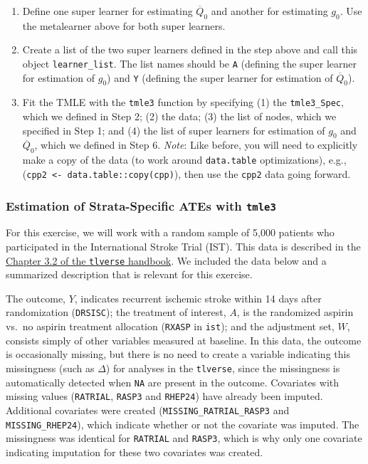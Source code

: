 \documentclass[12pt, krantz2,]{krantz}
\providecommand{\tightlist}{%
  \setlength{\itemsep}{0pt}\setlength{\parskip}{0pt}}
\theoremstyle{definition}
\theoremstyle{definition}
\theoremstyle{definition}
\newcommand{\1}{\mathbbm{1}}
\begin{document}
\begin{enumerate}
\def\labelenumi{\arabic{enumi}.}
\setcounter{enumi}{4}
\tightlist
\item
  Define one super learner for estimating \(\overline{Q}_0\) and another for
  estimating \(g_0\). Use the metalearner above for both super learners.
\item
  Create a list of the two super learners defined in the step above and call
  this object \texttt{learner\_list}. The list names should be \texttt{A} (defining the super
  learner for estimation of \(g_0\)) and \texttt{Y} (defining the super learner for
  estimation of \(\overline{Q}_0\)).
\item
  Fit the TMLE with the \texttt{tmle3} function by specifying (1) the \texttt{tmle3\_Spec},
  which we defined in Step 2; (2) the data; (3) the list of nodes, which we
  specified in Step 1; and (4) the list of super learners for estimation of
  \(g_0\) and \(\overline{Q}_0\), which we defined in Step 6. \emph{Note}: Like before,
  you will need to explicitly make a copy of the data (to work around
  \texttt{data.table} optimizations), e.g., (\texttt{cpp2\ \textless{}-\ data.table::copy(cpp)}), then
  use the \texttt{cpp2} data going forward.
\end{enumerate}

\hypertarget{tmle3-ex2}{%
\subsubsection{\texorpdfstring{Estimation of Strata-Specific ATEs with \texttt{tmle3}}{Estimation of Strata-Specific ATEs with tmle3}}\label{tmle3-ex2}}

For this exercise, we will work with a random sample of 5,000 patients who
participated in the International Stroke Trial (IST). This data is described in
the \protect\hyperlink{ist}{Chapter 3.2 of the \texttt{tlverse} handbook}. We included the data below
and a summarized description that is relevant for this exercise.

The outcome, \(Y\), indicates recurrent ischemic stroke within 14 days after
randomization (\texttt{DRSISC}); the treatment of interest, \(A\), is the randomized
aspirin vs.~no aspirin treatment allocation (\texttt{RXASP} in \texttt{ist}); and the
adjustment set, \(W\), consists simply of other variables measured at baseline. In
this data, the outcome is occasionally missing, but there is no need to create a
variable indicating this missingness (such as \(\Delta\)) for analyses in the
\texttt{tlverse}, since the missingness is automatically detected when \texttt{NA} are present
in the outcome. Covariates with missing values (\texttt{RATRIAL}, \texttt{RASP3} and \texttt{RHEP24})
have already been imputed. Additional covariates were created
(\texttt{MISSING\_RATRIAL\_RASP3} and \texttt{MISSING\_RHEP24}), which indicate whether or not
the covariate was imputed. The missingness was identical for \texttt{RATRIAL} and
\texttt{RASP3}, which is why only one covariate indicating imputation for these two
covariates was created.
\end{document}
